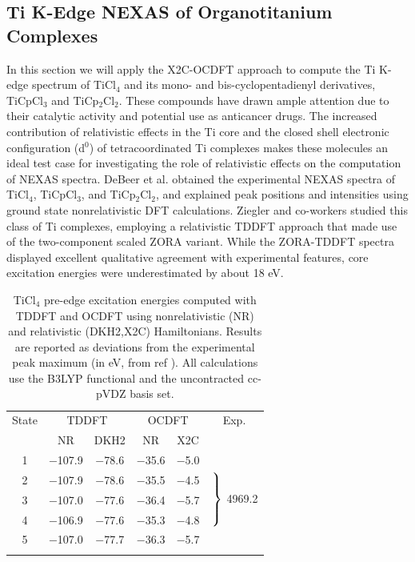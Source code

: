 \documentclass{article}
\begin{document}
\subsection{Ti K-Edge NEXAS of Organotitanium Complexes}
In this section we will apply the X2C-OCDFT approach to compute the Ti K-edge spectrum of TiCl$_4$ and its mono- and bis-cyclopentadienyl derivatives, TiCpCl$_3$ and TiCp$_2$Cl$_2$.
These compounds have drawn ample attention due to their catalytic activity and potential use as anticancer drugs.
The increased contribution of relativistic effects in the Ti core and the closed shell electronic configuration (d$^0$) of tetracoordinated Ti complexes makes these molecules an ideal test case for investigating the role of relativistic effects on the computation of NEXAS spectra. 
DeBeer et al.\cite{TiCl4} obtained the experimental NEXAS spectra of TiCl$_4$, TiCpCl$_3$, and TiCp$_2$Cl$_2$, and explained peak positions and intensities using ground state nonrelativistic DFT calculations. Ziegler and co-workers\cite{TiCl4-Zeigler} studied this class of Ti complexes, employing a relativistic TDDFT approach that made use of the two-component scaled ZORA variant\cite{ZORA-fix-energy-scale}. While the ZORA-TDDFT spectra displayed excellent qualitative agreement with experimental features\cite{TiCl4}, core excitation energies were underestimated by about 18 eV. 

\begin{table}[!t]
\caption{TiCl$_4$ pre-edge excitation energies computed with TDDFT and OCDFT using nonrelativistic (NR) and relativistic (DKH2,X2C) Hamiltonians.
Results are reported as deviations from the experimental peak maximum (in eV, from ref ).
All calculations use the B3LYP functional and the uncontracted cc-pVDZ basis set.}
\begin{tabular}{cccccc}
\toprule
State & \multicolumn{2}{c}{TDDFT} & \multicolumn{2}{c}{OCDFT} & Exp. \\ \cmidrule(r){2-3}  \cmidrule(l){4-5}
 & NR & DKH2 & NR & X2C  \\
\midrule
1 & $-$107.9& $-$78.6& $-$35.6& $-$5.0 & \multirow{5}{*}{$\left. \vphantom{\begin{tabular}{c}3\\3\\3 \\3\end{tabular}}\right\}$ 4969.2} \\
2 & $-$107.9& $-$78.6& $-$35.5& $-$4.5 \\
3 & $-$107.0& $-$77.6& $-$36.4& $-$5.7 \\
4 & $-$106.9& $-$77.6& $-$35.3& $-$4.8 \\
5 & $-$107.0& $-$77.7& $-$36.3& $-$5.7 \\
\bottomrule
	\label{table:Ti-complex}
\end{tabular}
\end{table}
\end{document}
